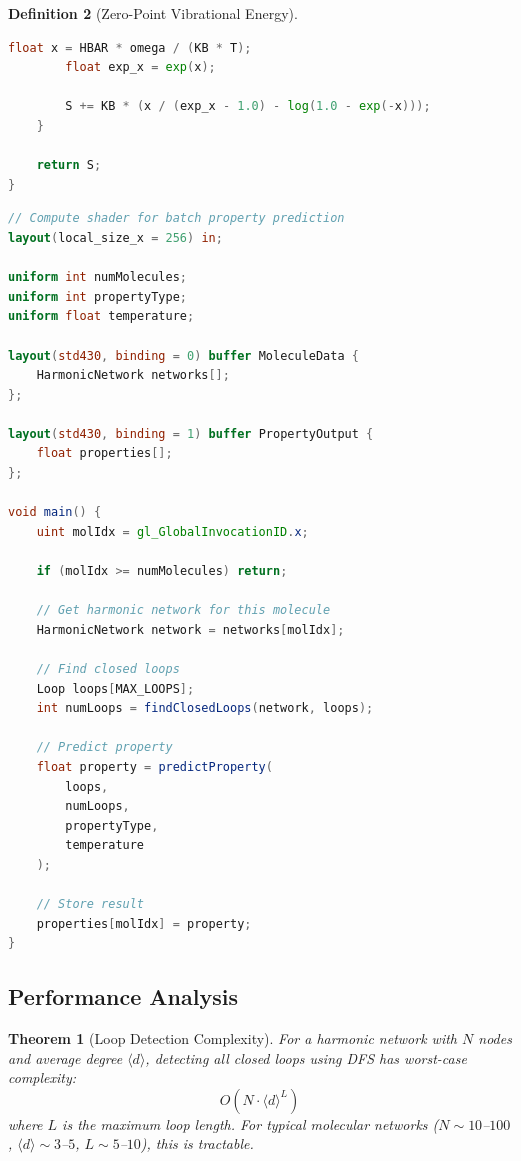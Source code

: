 \documentclass[11pt,a4paper]{article}
\newtheorem{theorem}{Theorem}[section]
\theoremstyle{definition}
\newtheorem{definition}[theorem]{Definition}
\theoremstyle{remark}
\begin{document}
\begin{definition}[Zero-Point Vibrational Energy]
\begin{lstlisting}[language=GLSL,caption={Property Prediction from Loops}]
        float x = HBAR * omega / (KB * T);
        float exp_x = exp(x);
        
        S += KB * (x / (exp_x - 1.0) - log(1.0 - exp(-x)));
    }
    
    return S;
}
\end{lstlisting}

\begin{lstlisting}[language=GLSL,caption={GPU Property Prediction Kernel}]
// Compute shader for batch property prediction
layout(local_size_x = 256) in;

uniform int numMolecules;
uniform int propertyType;
uniform float temperature;

layout(std430, binding = 0) buffer MoleculeData {
    HarmonicNetwork networks[];
};

layout(std430, binding = 1) buffer PropertyOutput {
    float properties[];
};

void main() {
    uint molIdx = gl_GlobalInvocationID.x;
    
    if (molIdx >= numMolecules) return;
    
    // Get harmonic network for this molecule
    HarmonicNetwork network = networks[molIdx];
    
    // Find closed loops
    Loop loops[MAX_LOOPS];
    int numLoops = findClosedLoops(network, loops);
    
    // Predict property
    float property = predictProperty(
        loops,
        numLoops,
        propertyType,
        temperature
    );
    
    // Store result
    properties[molIdx] = property;
}
\end{lstlisting}

\subsection{Performance Analysis}

\begin{theorem}[Loop Detection Complexity]
\label{thm:loop_complexity}
For a harmonic network with $N$ nodes and average degree $\langle d \rangle$, detecting all closed loops using DFS has worst-case complexity:
\begin{equation}
O(N \cdot \langle d \rangle^L)
\end{equation}
where $L$ is the maximum loop length. For typical molecular networks ($N \sim 10$--$100$, $\langle d \rangle \sim 3$--$5$, $L \sim 5$--$10$), this is tractable.
\end{theorem}


\end{definition}
\end{document}
